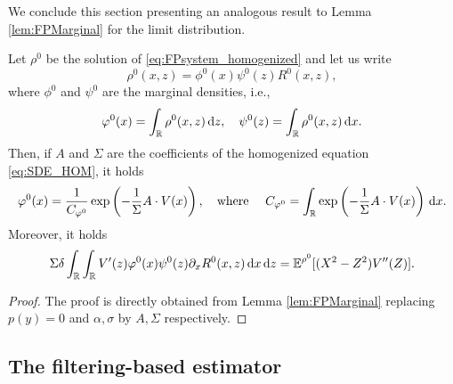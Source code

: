\documentclass[10pt]{article}
\begin{document}
We conclude this section presenting an analogous result to Lemma \ref{lem:FPMarginal} for the limit distribution.

\begin{corollary}\label{lem:FPMarginal_Hom} Let $\rho^0$ be the solution of \eqref{eq:FPsystem_homogenized} and let us write 
	\begin{equation}
		\rho^0(x, z) = \phi^0(x)\psi^0(z)R^0(x,z),
	\end{equation}
	where $\phi^0$ and $\psi^0$ are the marginal densities, i.e., 
	\begin{equation}
		\varphi^0(x) = \int_{\mathbb{R}} \rho^0(x,z) \,\mathrm{d} z, \quad \psi^0(z) = \int_{\mathbb{R}} \rho^0(x,z) \,\mathrm{d} x.
	\end{equation}
	Then, if $A$ and $\Sigma$ are the coefficients of the homogenized equation \eqref{eq:SDE_HOM}, it holds
	\begin{equation}
		\varphi^0(x) = \frac{1}{C_{\varphi^0}} \exp\left(- \frac1{\Sigma} A\cdot V(x)\right), \quad \text{where } \quad C_{\varphi^0} = \int_{\mathbb{R}} \exp\left(- \frac1{\Sigma} A\cdot V(x) \right) \,\mathrm{d} x.
	\end{equation}
	Moreover, it holds
	\begin{equation}
		\Sigma \delta \int_{\mathbb{R}} \int_{\mathbb{R}} V'(z) \varphi^0(x) \psi^0(z) \partial_x R^0(x,z) \,\mathrm{d} x \,\mathrm{d} z = \operatorname{\mathbb{E}}^{\rho^0}[(X^2 - Z^2)V''(Z)].
	\end{equation}
\end{corollary}
\begin{proof} The proof is directly obtained from Lemma \ref{lem:FPMarginal} replacing $p(y)=0$ and $\alpha, \sigma$ by $A, \Sigma$ respectively. 
\end{proof}

\subsection{The filtering-based estimator}\label{sec:FilterMLE}
\end{document}
